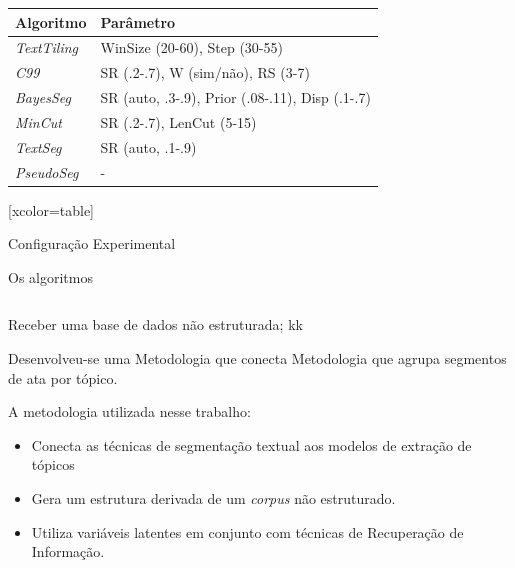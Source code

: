 \begin{table}
\begin{tabular}{l | l }
	Algoritmo & Parâmetro \\
\hline \hline


\textit{TextTiling} & WinSize (20-60), Step (30-55)                    \\ 
\textit{C99} &        SR (.2-.7), W (sim/não), RS (3-7)                           \\ 
\textit{BayesSeg} &   SR (auto, .3-.9), Prior (.08-.11), Disp (.1-.7)         \\ 
\textit{MinCut} &     SR (.2-.7), LenCut (5-15)                             \\ 
\textit{TextSeg} &    SR (auto, .1-.9)                                       \\ 
\textit{PseudoSeg} &  -       \\ 

\end{tabular}
\end{table}






[xcolor=table]
\usepackage[table]{xcolor}

\begin{frame}{Configuração Experimental}

	\nblock{}{
		\begin{itemize}
			\item 
		\end{itemize}
	}
\end{frame}



Os algoritmos 


\begin{columns}
    \begin{column}{0.48\textwidth}
    \end{column}
    \begin{column}{0.48\textwidth}
    \end{column}
\end{columns}




Receber uma base de dados não estruturada;
kk


Desenvolveu-se uma
Metodologia que conecta 
Metodologia que agrupa segmentos de ata por tópico.


A metodologia utilizada nesse trabalho: 
\begin{itemize}
	\item Conecta as técnicas de segmentação textual aos modelos de extração de tópicos 
	\item Gera um estrutura derivada de um \textit{corpus} não estruturado.
	\item Utiliza variáveis latentes em conjunto com técnicas de Recuperação de Informação.
\end{itemize}


